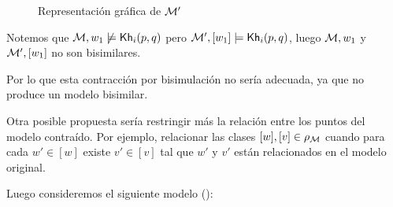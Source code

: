 \begin{figure}[h]
    \hspace{3.2cm}
    \vspace{0.8cm}
    \hspace{1cm}
    \caption{Representación gráfica de $\mathcal{M}'$}
    \label{fig:1stproposalcontraction}
\end{figure}

Notemos que $\mathcal{M}, w_1 \not\models \mathsf{Kh}_i(p,q)$ pero $\mathcal{M}', [w_1] \models \mathsf{Kh}_i(p,q)$, luego $\mathcal{M},w_1$ y 
$\mathcal{M}',[w_1]$ no son bisimilares.

Por lo que esta contracción por bisimulación no sería adecuada, ya que no produce un modelo bisimilar.

Otra posible propuesta sería restringir más la relación entre los puntos del modelo contraído. Por ejemplo, relacionar las clases 
$[w], [v] \in \rho_{\mathcal{M}}$ cuando para cada $w' \in [w]$ existe $v' \in [v]$ tal que $w'$ y $v'$ están relacionados en el modelo original.

Luego consideremos el siguiente modelo ():

